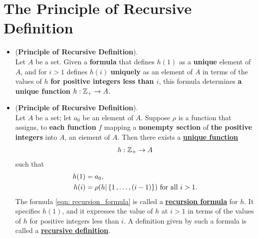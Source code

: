 \documentclass[11pt]{article}
\begin{document}
\section{The Principle of Recursive Definition}
\begin{itemize}

\item \begin{principle} (\textbf{Principle of Recursive Definition}).  \citep{munkres2000topology} \\
Let $A$ be a set. Given a \textbf{formula} that defines $h(1)$ as a \textbf{unique} element of $A$, and for $i > 1$ defines $h(i)$ \textbf{uniquely} as an element of $A$ in terms of the values of $h$ \textbf{for positive integers less than $i$}, this formula determines \textbf{a unique function} $h: {\mathbb Z}_{+} \rightarrow A$.
\end{principle}

\item \begin{theorem} (\textbf{Principle of Recursive Definition}).  \citep{munkres2000topology} \\
Let $A$ be a set; let $a_0$ be an element of $A$. Suppose $\rho$ is a function that assigns, to \textbf{each function} $f$ mapping a \textbf{nonempty section} of \textbf{the positive integers} into $A$, an eiement of $A$. Then there exists a \underline{\textbf{unique function}}
\begin{align*}
h: {\mathbb Z}_{+} \rightarrow A
\end{align*} such that
\begin{align}
h(1) &= a_0, \nonumber\\
h(i)  &=\rho(h | \left\{1 \,{,}\ldots{,}\, (i-1)\right\})\text{ for all }i > 1.  \label{eqn: recursion_formula}
\end{align}
The formula \eqref{eqn: recursion_formula} is called a \underline{\textbf{recursion formula}} for $h$. It specifies $h(1)$, and it
expresses the value of $h$ at $i > 1$ in terms of the values of $h$ for positive integers less than $i$. A definition given by such a formula is called a \underline{\textbf{recursive definition}}.
\end{theorem}


\end{itemize}
\end{document}

